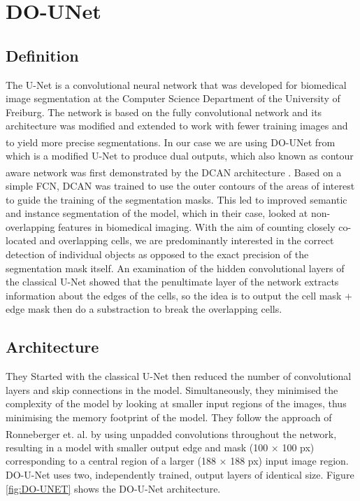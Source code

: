 \section{DO-UNet}
\subsection{Definition}
\hspace{\parindent}
The U-Net is a convolutional neural network that was developed for biomedical image segmentation at the Computer Science Department of the University of Freiburg. The network is based on the fully convolutional network and its architecture was modified and extended to work with fewer training images and to yield more precise segmentations. In our case we are using DO-UNet from \textsuperscript{\cite{10.1007/978-3-030-44584-3_31}} which is a modified U-Net to produce dual outputs, which also known as contour aware network was first demonstrated by the DCAN architecture \textsuperscript{\cite{chen2016dcan}}. Based on a simple FCN, DCAN was trained to use the outer
contours of the areas of interest to guide the training of the segmentation masks. This led to improved semantic and instance segmentation of the model, which in their case, looked at non-overlapping features in biomedical imaging.
With the aim of counting closely co-located and overlapping cells, we are predominantly interested in the correct detection of individual objects as
opposed to the exact precision of the segmentation mask itself. An examination
of the hidden convolutional layers of the classical U-Net showed that the penultimate layer of the network extracts information about the edges of the cells, so the idea is to output the cell mask + edge mask then do a substraction to break the overlapping cells.

\subsection{Architecture}
\hspace{\parindent}
They Started with the classical U-Net then reduced the number of
convolutional layers and skip connections in the model. Simultaneously, they minimised the complexity of the model by looking at smaller input regions of the images, thus minimising the memory footprint of the model. They follow the approach of Ronneberger et. al. \textsuperscript{\cite{10.1007/978-3-030-44584-3_31}} by using unpadded convolutions throughout the network, resulting in a model with smaller output edge and mask (100 × 100 px) corresponding to a central region of a larger (188 × 188 px) input image region. DO-U-Net uses two, independently trained, output layers of identical size. Figure \ref{fig:DO-UNET} shows the DO-U-Net architecture.


